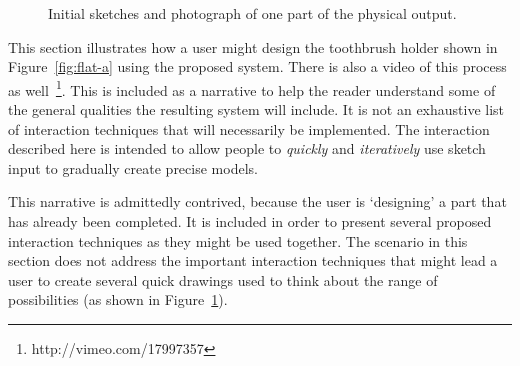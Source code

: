 \documentclass[11pt]{article}
\begin{document}
\begin{figure}[] 
\centering
{}
\hspace{5mm} 
\hspace{5mm} 
\caption{Initial sketches and photograph of one part of the physical
  output.}
\label{fig:physical-sketches}
\end{figure}

This section illustrates how a user might design the toothbrush holder
shown in Figure~\ref{fig:flat-a} using the proposed system. There is
also a video of this process as
well~\footnote{http://vimeo.com/17997357}. This is included as a
narrative to help the reader understand some of the general qualities
the resulting system will include. It is not an exhaustive list of
interaction techniques that will necessarily be implemented. The
interaction described here is intended to allow people to
\textit{quickly} and \textit{iteratively} use sketch input to
gradually create precise models.

This narrative is admittedly contrived, because the user is
`designing' a part that has already been completed. It is included in
order to present several proposed interaction techniques as they might
be used together. The scenario in this section does not address the
important interaction techniques that might lead a user to create
several quick drawings used to think about the range of possibilities
(as shown in Figure~\ref{fig:physical-sketches}).
\end{document}
